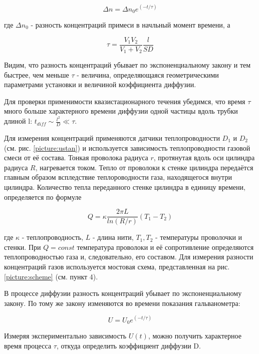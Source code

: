 \documentclass[a4paper,12pt]{article}
\begin{document}
\begin{equation}\label{eq:7}
    \Delta n = \Delta n_0 e^{(-t/\tau)}
\end{equation}

где $\Delta n_0$ - разность концентраций примеси в начльный момент времени, а

\begin{equation}\label{eq:8}
    \tau = \frac{V_1 V_2}{V_1 + V_2} \frac {l}{SD}
\end{equation}

Видим, что разность концентраций убывает по экспоненциальному закону и тем быстрее, чем меньше $\tau$ - величина, определяющаяся геометрическими параметрами установки и величиной коэффициента диффузии.

Для проверки применимости квазистационарного течения убедимся, что время $\tau$ много больше характерного времени диффузии одной частицы вдоль трубки длиной l: $\displaystyle t_{diff} \sim \frac{l^2}{D} \ll \tau$.

Для измерения концентраций применяются датчики теплопроводности $D_1$ и $D_2$ (см. рис. \ref{picture:ustan}) и используется зависимость теплопроводности газовой смеси от её состава. Тонкая проволока радиуса $r$, протянутая вдоль оси цилиндра радиуса $R$, нагревается током. Тепло от проволоки к стенке цилиндра передаётся главным образом вспледствие теплороводности газа, находящегося внутри цилиндра. Количество тепла переданного стенке цилиндра в единицу времени, определяется по формуле

\begin{equation}
    Q = \kappa \frac{2\pi L}{ln (R/r)}(T_1-T_2)
\end{equation}

где $\kappa$ - теплопроводность, $L$ - длина нити, $T_1, T_2$ - температуры проволочки и стенки. При $Q = const$ температура проволоки и её сопротивление определяются теплопроводностью газа и, следовательно, его составом. Для измерения разности концентраций газов используется мостовая схема, представленная на рис. \ref{picture:scheme} (см. пункт 4).

В процессе диффузии разность концентраций убывает по экспоненциальному закону. По тому же закону изменяются во времени показания гальванометра:

\begin{equation}
    U = U_0 e^{(-t/\tau)}
\end{equation}

Измеряя экспериментально зависимость $U(t)$, можно получить характерное время процесса $\tau$, откуда определить коэффициент диффузии D.
\end{document}
